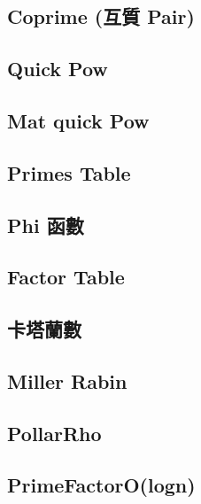 \subsection{Coprime (互質 Pair)}


\subsection{Quick Pow}


\subsection{Mat quick Pow}


\subsection{Primes Table}


\subsection{Phi 函數}


\subsection{Factor Table}


\subsection{卡塔蘭數}


\subsection{Miller Rabin}


\subsection{PollarRho}


\subsection{PrimeFactorO(logn)}


